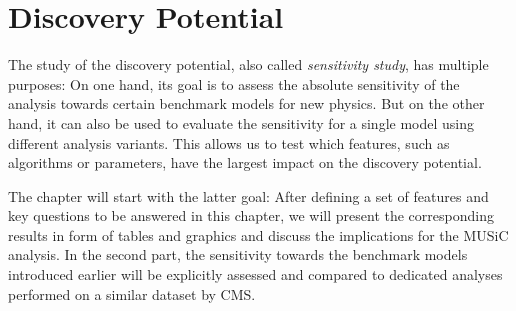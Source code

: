 
\newcommand{\lumiA}{\SI{2.3}{\per\femto\barn}\xspace}
\newcommand{\lumiB}{\SI{35.9}{\per\femto\barn}\xspace}

\chapter{Discovery Potential}
\label{chap:sensitivity_studies}

The study of the discovery potential, also called \emph{sensitivity study}, has multiple purposes: On one hand, its goal is to assess the absolute sensitivity of the analysis towards certain benchmark models for new physics. But on the other hand, it can also be used to evaluate the sensitivity for a single model using different analysis variants. This allows us to test which features, such as algorithms or parameters, have the largest impact on the discovery potential.

The chapter will start with the latter goal: After defining a set of features and key questions to be answered in this chapter, we will present the corresponding results in form of tables and graphics and discuss the implications for the \ac{MUSiC} analysis. 
In the second part, the sensitivity towards the benchmark models introduced earlier will be explicitly assessed and compared to dedicated analyses performed on a similar dataset by \ac{CMS}.

